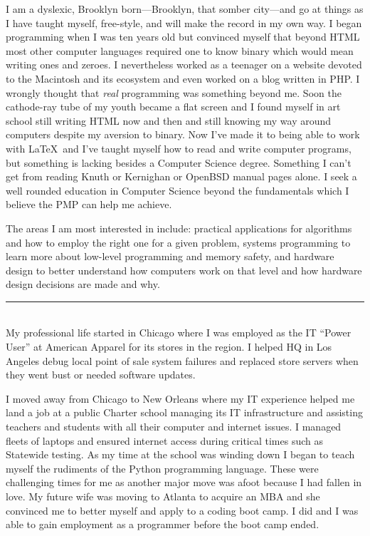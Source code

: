 \documentclass[12pt]{article}
\begin{document}
I am a dyslexic, Brooklyn born---Brooklyn, that somber city---and go at things as I have taught myself, free-style, and will make the record in my own way.
I began programming when I was ten years old but convinced myself that beyond HTML most other computer languages required one to know binary which would mean writing ones and zeroes. I nevertheless worked as a teenager on a website devoted to the Macintosh and its ecosystem and even worked on a blog written in PHP. I wrongly thought that \emph{real} programming was something beyond me. Soon the cathode-ray tube of my youth became a flat screen and I found myself in art school still writing HTML now and then and still knowing my way around computers despite my aversion to binary. Now I've made it to being able to work with \LaTeX\ and I've taught myself how to read and write computer programs, but something is lacking besides a Computer Science degree. Something I can't get from reading Knuth or Kernighan or OpenBSD manual pages alone. I seek a well rounded education in Computer Science beyond the fundamentals which I believe the PMP can help me achieve.

The areas I am most interested in include: practical applications for algorithms and how to employ the right one for a given problem, systems programming to learn more about low-level programming and memory safety, and hardware design to better understand how computers work on that level and how hardware design decisions are made and why.\\

\hrule\
\\

My professional life started in Chicago where I was employed as the IT ``Power User'' at American Apparel for its stores in the region. I helped HQ in Los Angeles debug local point of sale system failures and replaced store servers when they went bust or needed software updates.

I moved away from Chicago to New Orleans where my IT experience helped me land a job at a public Charter school managing its IT infrastructure and assisting teachers and students with all their computer and internet issues. I managed fleets of laptops and ensured internet access during critical times such as Statewide testing. As my time at the school was winding down I began to teach myself the rudiments of the Python programming language. These were challenging times for me as another major move was afoot because I had fallen in love. My future wife was moving to Atlanta to acquire an MBA and she convinced me to better myself and apply to a coding boot camp. I did and I was able to gain employment as a programmer before the boot camp ended.
\end{document}
